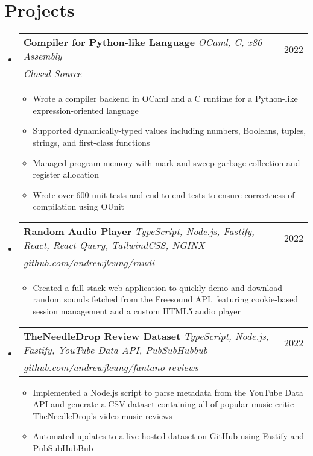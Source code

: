 \documentclass[letterpaper, 11pt]{article}
\makeatletter
\newcommand{\resumeItem}[1]{
  \item\small{
    {#1 \vspace{-2pt}}
  }
}
\newcommand{\resumeProjectHeading}[3]{
    \item
    \begin{tabular*}{0.97\textwidth}{l@{\extracolsep{\fill}}r}
      \small#1 & #2 \\
     \textit{\small{#3}}
    \end{tabular*}\vspace{-7pt}
}
\newcommand{\resumeSubHeadingListStart}{\begin{itemize}[leftmargin=0.15in, label={}]}
\newcommand{\resumeSubHeadingListEnd}{\end{itemize}}
\newcommand{\resumeItemListStart}{\begin{itemize}}
\newcommand{\resumeItemListEnd}{\end{itemize}\vspace{-5pt}}
\makeatother
\begin{document}
\section{Projects}
    \resumeSubHeadingListStart
        \resumeProjectHeading
            {\textbf{Compiler for Python-like Language} \emph{OCaml, C, x86 Assembly}}{2022}{Closed Source}
            \resumeItemListStart
                \resumeItem{Wrote a compiler backend in OCaml and a C runtime for a Python-like expression-oriented language}
                \resumeItem{Supported dynamically-typed values including numbers, Booleans, tuples, strings, and first-class functions}
                \resumeItem{Managed program memory with mark-and-sweep garbage collection and register allocation}
                \resumeItem{Wrote over 600 unit tests and end-to-end tests to ensure correctness of compilation using OUnit}
            \resumeItemListEnd
        \resumeProjectHeading
            {\textbf{Random Audio Player} \emph{TypeScript, Node.js, Fastify, React, React Query, TailwindCSS, NGINX}}{2022}{github.com/andrewjleung/raudi}
            \resumeItemListStart
                \resumeItem{Created a full-stack web application to quickly demo and download random sounds fetched from the Freesound API, featuring cookie-based session management and a custom HTML5 audio player}
            \resumeItemListEnd
        \resumeProjectHeading
            {\textbf{TheNeedleDrop Review Dataset} \emph{TypeScript, Node.js, Fastify, YouTube Data API, PubSubHubbub}}{2022}{github.com/andrewjleung/fantano-reviews}
            \resumeItemListStart
                \resumeItem{Implemented a Node.js script to parse metadata from the YouTube Data API and generate a CSV dataset containing all of popular music critic TheNeedleDrop's video music reviews}
                \resumeItem{Automated updates to a live hosted dataset on GitHub using Fastify and PubSubHubBub}
            \resumeItemListEnd  
    \resumeSubHeadingListEnd

\end{document}
